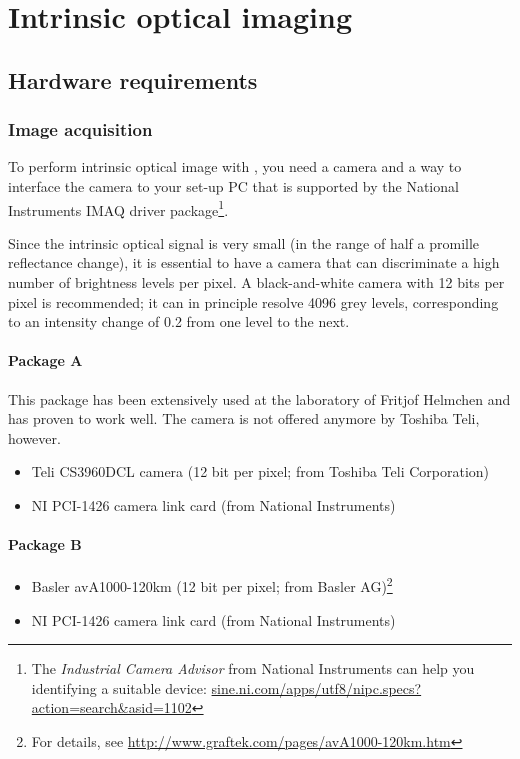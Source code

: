 \chapter{Intrinsic optical imaging}

\section{Hardware requirements}

\subsection{Image acquisition}\label{sec:intrinsic_hardware_acquisition}
To perform intrinsic optical image with \HS, you need a camera and a way to interface the camera to your set-up PC that is supported by the National Instruments  \acs{IMAQ} driver package\footnote{The \textit{Industrial Camera Advisor} from National Instruments can help you identifying a suitable device: \url{sine.ni.com/apps/utf8/nipc.specs?action=search&asid=1102}}.

Since the intrinsic optical signal is very small (in the range of half a promille reflectance change), it is essential to have a camera that can discriminate a high number of brightness levels per pixel. A black-and-white camera with 12 bits per pixel is recommended; it can in principle resolve 4096 grey levels, corresponding to an intensity change of \SI{0.2}{\textperthousand} from one level to the next.

\subsubsection{Package A}
This package has been extensively used at the laboratory of Fritjof Helmchen and has proven to work well. The camera is not offered anymore by Toshiba Teli, however. 
\begin{itemize}[noitemsep]
    \item Teli CS3960DCL camera (12 bit per pixel; from Toshiba Teli Corporation)
    \item \acs{NI} PCI-1426 camera link card (from National Instruments)
\end{itemize}

\subsubsection{Package B}
\begin{itemize}[noitemsep]
	\item Basler avA1000-120km (12 bit per pixel; from Basler AG)\footnote{For details, see \url{http://www.graftek.com/pages/avA1000-120km.htm}}
	\item \acs{NI} PCI-1426 camera link card (from National Instruments)
\end{itemize}

